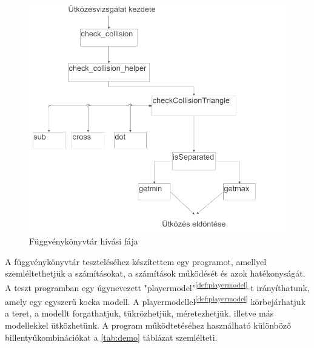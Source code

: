 \begin{figure}[h]
	\centering
	\includegraphics[width=15truecm, height=15truecm]{images/blokk_diagram.png}
	\caption{Függvénykönyvtár hívási fája}
	\label{fig:blokkdiagram}
\end{figure}




\newpage


\label{chap:demo}
A függvénykönyvtár teszteléséhez készítettem egy programot, amellyel szemléltethetjük a számításokat, a számítások működését és azok hatékonyságát. A teszt programban egy úgynevezett "playermodel"\textsuperscript{\ref{def:playermodel}}-t irányíthatunk, amely egy egyszerű kocka modell. A playermodellel\textsuperscript{\ref{def:playermodel}} körbejárhatjuk a teret, a modellt forgathatjuk, tükrözhetjük, méretezhetjük, illetve más modellekkel ütközhetünk. A program működtetéséhez használható különböző billentyűkombinációkat a \ref{tab:demo} táblázat szemlélteti.

